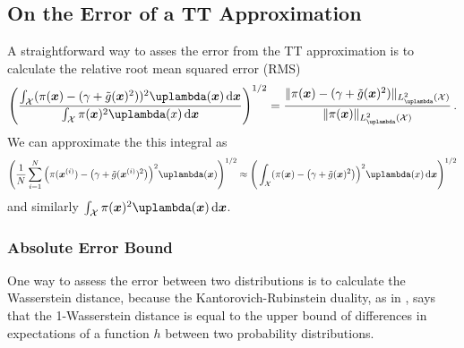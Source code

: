 \subsection{On the Error of a TT Approximation}
A straightforward way to asses the error from the TT approximation is to calculate the relative root mean squared error (RMS)
\begin{align}
	\Bigg( \frac{ \int_{\mathcal{X}} (\pi(\bm{x}) - (\gamma + \tilde{g}(\bm{x})^2))^2 \uplambda(\bm{x}) \diff \bm{x}}{ \int_{\mathcal{X}} \pi(\bm{x})^2 \uplambda(x)  \diff \bm{x} } \Bigg)^{1/2} =	\frac{\lVert 	\pi(\bm{x}) - (\gamma + \tilde{g}(\bm{x})^2)  \rVert_{L^2_{\uplambda}(\mathcal{X})}}{\lVert 	\pi(\bm{x}) \rVert_{L^2_{\uplambda}(\mathcal{X})}  } \, .
\end{align}
We can approximate the this integral as 
\begin{align}
	\Bigg( \frac{1}{N} \sum^{N}_{i =1} \Big(\pi(\bm{x}^{(i)}) - \big(\gamma + \tilde{g}(\bm{x}^{(i)})^2\big)\Big)^2 \uplambda(\bm{x})\Bigg)^{1/2}    \approx \Bigg(  \int_{\mathcal{X}} (\pi(\bm{x}) - \big(\gamma + \tilde{g}(\bm{x})^2\big)\Big)^2 \uplambda(x) \diff \bm{x} \Bigg)^{1/2} 
\end{align}
and similarly $\int_{\mathcal{X}} \pi(\bm{x})^2 \uplambda(\bm{x})  \diff \bm{x}$.


\subsubsection{Absolute Error Bound}
\label{subsec:wasser}
One way to assess the error between two distributions is to calculate the Wasserstein distance, because the Kantorovich-Rubinstein duality, as in \cite{thickstun2019kantorovich, Ambrosio2024Kanta}, says that the 1-Wasserstein distance is equal to the upper bound of differences in expectations of a function $h$ between two probability distributions.


